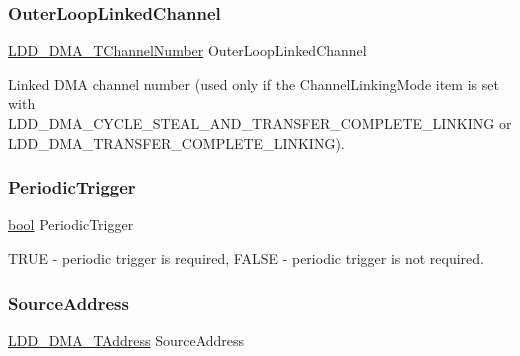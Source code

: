 \subsubsection{\texorpdfstring{Outer\+Loop\+Linked\+Channel}{OuterLoopLinkedChannel}}
{\footnotesize\ttfamily \hyperlink{group___p_e___types__module_gad268d607015891269cb015faa8bc0dac}{L\+D\+D\+\_\+\+D\+M\+A\+\_\+\+T\+Channel\+Number} Outer\+Loop\+Linked\+Channel}

Linked D\+MA channel number (used only if the Channel\+Linking\+Mode item is set with L\+D\+D\+\_\+\+D\+M\+A\+\_\+\+C\+Y\+C\+L\+E\+\_\+\+S\+T\+E\+A\+L\+\_\+\+A\+N\+D\+\_\+\+T\+R\+A\+N\+S\+F\+E\+R\+\_\+\+C\+O\+M\+P\+L\+E\+T\+E\+\_\+\+L\+I\+N\+K\+I\+NG or L\+D\+D\+\_\+\+D\+M\+A\+\_\+\+T\+R\+A\+N\+S\+F\+E\+R\+\_\+\+C\+O\+M\+P\+L\+E\+T\+E\+\_\+\+L\+I\+N\+K\+I\+NG). \mbox{\label{struct_l_d_d___d_m_a___t_transfer_descriptor_a3e0a883d708eebc01cf07a24d45e53bb}} 
\subsubsection{\texorpdfstring{Periodic\+Trigger}{PeriodicTrigger}}
{\footnotesize\ttfamily \hyperlink{group___p_e___types__module_ga97a80ca1602ebf2303258971a2c938e2}{bool} Periodic\+Trigger}

T\+R\+UE -\/ periodic trigger is required, F\+A\+L\+SE -\/ periodic trigger is not required. \mbox{\label{struct_l_d_d___d_m_a___t_transfer_descriptor_ad5ae78062f8199ddc7ca0e1a25f532b7}} 
\subsubsection{\texorpdfstring{Source\+Address}{SourceAddress}}
{\footnotesize\ttfamily \hyperlink{group___p_e___types__module_gab8287f62db7ff96992355760b652cd07}{L\+D\+D\+\_\+\+D\+M\+A\+\_\+\+T\+Address} Source\+Address}


